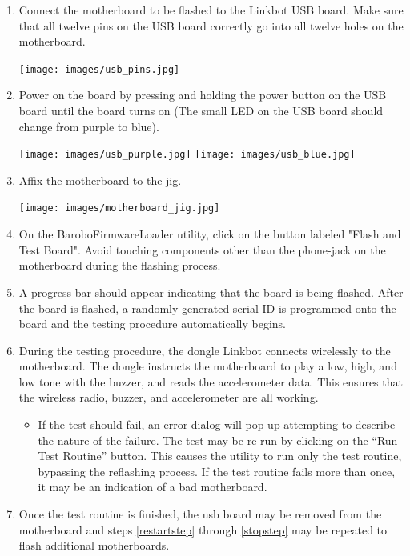 \documentclass{article}
\begin{document}
\begin{enumerate}
\item \label{restartstep}Connect the motherboard to be flashed to the Linkbot USB board. Make sure
   that all twelve pins on the USB board correctly go into all twelve holes on
   the motherboard.

   \begin{center}
   \texttt{[image: images/usb\_pins.jpg]}
   \end{center}

\item Power on the board by pressing and holding the power button on the USB board
   until the board turns on (The small LED on the USB board should change from
   purple to blue).

   \begin{center}
   \texttt{[image: images/usb\_purple.jpg]}
   \texttt{[image: images/usb\_blue.jpg]}
   \end{center}

\item Affix the motherboard to the jig. 

   \begin{center}
   \texttt{[image: images/motherboard\_jig.jpg]}
   \end{center}

\item On the BaroboFirmwareLoader utility, click on the button labeled "Flash
  and Test Board". Avoid touching components other than the phone-jack on the
  motherboard during the flashing process.
\item A progress bar should appear indicating that the board is being flashed. 
  After the board is flashed, a randomly generated serial ID is programmed onto 
  the board and the testing procedure automatically begins.
\item During the testing procedure, the dongle Linkbot connects wirelessly to
  the motherboard. The dongle instructs the motherboard to 
  play a low, high, and low tone with the buzzer, and reads
  the accelerometer data. This ensures that the wireless radio, buzzer, and
  accelerometer are all working.
  \begin{itemize}
    \item If the test should fail, an error dialog will pop up attempting to
    describe the nature of the failure. The test may be re-run by clicking on
    the ``Run Test Routine'' button. This causes the utility to run only the
    test routine, bypassing the reflashing process. If the test routine fails
    more than once, it may be an indication of a bad motherboard.
  \end{itemize}
\item \label{stopstep} Once the test routine is finished, the usb board may be removed from the
  motherboard and steps \ref{restartstep} through
  \ref{stopstep} may be repeated to flash additional motherboards.
\end{enumerate}
\end{document}
